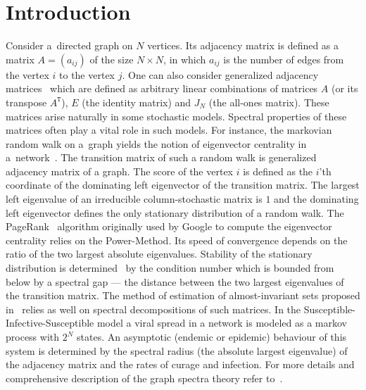 \documentclass[a4paper]{jpconf}
\begin{document}
\section{Introduction}
Consider a~directed graph on \( N \) vertices.
Its adjacency matrix is defined as
    a matrix
    \( A = (a_{ij}) \)
    of the size \( N\times N \),
    in which \( a_{ij} \)
    is the number of edges
    from the vertex \( i \)
    to the vertex \( j \).
One can also consider generalized
    adjacency matrices~\cite{van2003graphs}
    which are defined as
    arbitrary linear combinations
    of matrices \( A \) (or its transpose \( A^\mathtt{T} \)),
    \( E \) (the identity matrix)
    and \( J_N \) (the all-ones matrix).
These matrices arise naturally
    in some stochastic models.
Spectral  properties of these matrices
    often play a vital role in such models.
For instance, the markovian random walk on a~graph
    yields the notion of eigenvector centrality
    in a~network~\cite{bonacich1972factoring}.
The transition matrix of such a random walk
    is generalized adjacency matrix of a graph.
The score of the vertex \( i \)
    is defined as the \( i \)'th coordinate
    of the dominating left eigenvector
    of the transition matrix.
The largest left eigenvalue of an irreducible column-stochastic matrix
    is \( 1 \) and the dominating left eigenvector
    defines the only stationary distribution
    of a random walk.
The PageRank~\cite{ilprints422} algorithm
    originally used by Google
    to compute the eigenvector centrality
    relies on the Power-Method.
Its speed of convergence depends on
    the ratio of the two largest absolute eigenvalues.
Stability of the stationary distribution
    is determined~\cite{meyer1994sensitivity}
    by the condition number
    which is bounded from below
    by a spectral gap --- the distance between
    the two largest eigenvalues
    of the transition matrix.
The method of estimation of almost-invariant sets
    proposed in~\cite{schwartz2006fluctuation}
    relies as well on spectral decompositions of such matrices.
In the Susceptible-Infective-Susceptible model
    a viral spread in a network
    is modeled as a markov process
    with \( 2^N \) states.
An asymptotic (endemic or epidemic) behaviour of this system
    is determined by the spectral radius (the absolute largest eigenvalue)
    of the adjacency matrix
    and the rates of curage and infection.
For more details and comprehensive description
    of the graph spectra theory
    refer to~\cite{cvetkovic1980spectra,godsil2013algebraic}.
\end{document}
